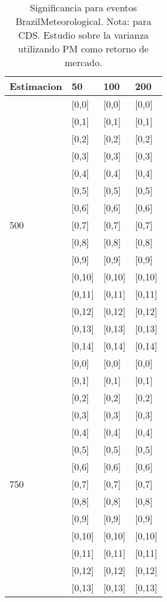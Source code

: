 \begin{table}

\caption{Significancia para eventos BrazilMeteorological. Nota: para CDS. Estudio sobre la varianza utilizando PM como retorno de mercado.}
\centering
\begin{tabular}[t]{llll}
\toprule
Estimacion & 50 & 100 & 200\\
\midrule
 & {}[0,0] & {}[0,0] & {}[0,0]\\
 & {}[0,1] & {}[0,1] & {}[0,1]\\
 & {}[0,2] & {}[0,2] & {}[0,2]\\
 & {}[0,3] & {}[0,3] & {}[0,3]\\
 & {}[0,4] & {}[0,4] & {}[0,4]\\
\addlinespace
 & {}[0,5] & {}[0,5] & {}[0,5]\\
 & {}[0,6] & {}[0,6] & {}[0,6]\\
500 & {}[0,7] & {}[0,7] & {}[0,7]\\
 & {}[0,8] & {}[0,8] & {}[0,8]\\
 & {}[0,9] & {}[0,9] & {}[0,9]\\
\addlinespace
 & {}[0,10] & {}[0,10] & {}[0,10]\\
 & {}[0,11] & {}[0,11] & {}[0,11]\\
 & {}[0,12] & {}[0,12] & {}[0,12]\\
 & {}[0,13] & {}[0,13] & {}[0,13]\\
 & {}[0,14] & {}[0,14] & {}[0,14]\\
\addlinespace
 & {}[0,0] & {}[0,0] & {}[0,0]\\
 & {}[0,1] & {}[0,1] & {}[0,1]\\
 & {}[0,2] & {}[0,2] & {}[0,2]\\
 & {}[0,3] & {}[0,3] & {}[0,3]\\
 & {}[0,4] & {}[0,4] & {}[0,4]\\
\addlinespace
 & {}[0,5] & {}[0,5] & {}[0,5]\\
 & {}[0,6] & {}[0,6] & {}[0,6]\\
750 & {}[0,7] & {}[0,7] & {}[0,7]\\
 & {}[0,8] & {}[0,8] & {}[0,8]\\
 & {}[0,9] & {}[0,9] & {}[0,9]\\
\addlinespace
 & {}[0,10] & {}[0,10] & {}[0,10]\\
 & {}[0,11] & {}[0,11] & {}[0,11]\\
 & {}[0,12] & {}[0,12] & {}[0,12]\\
 & {}[0,13] & {}[0,13] & {}[0,13]\\

\end{tabular}
\end{table}
